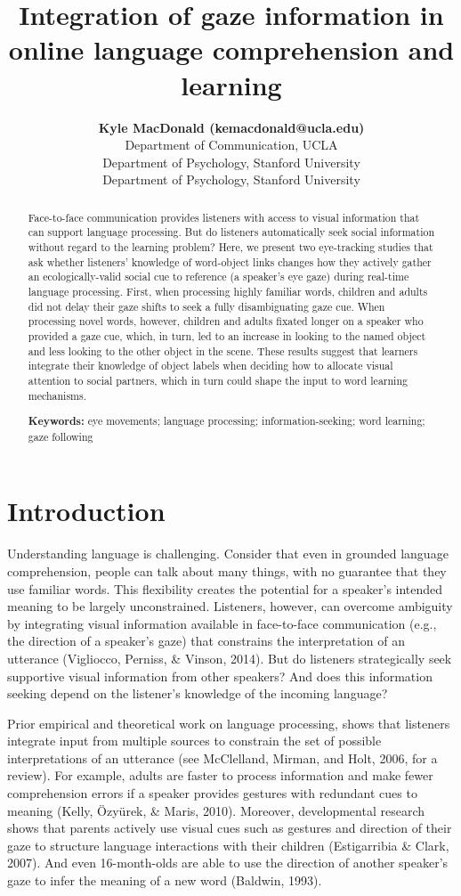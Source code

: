 \documentclass[10pt, letterpaper]{article}
\title{Integration of gaze information in online language comprehension and
learning}
\author{{\large \bf Kyle MacDonald (kemacdonald@ucla.edu)} \\ Department of Communication, UCLA  \AND {\large \bf Elizabeth Swanson (elizswan@stanford.edu)} \\ Department of Psychology, Stanford University  \AND {\large \bf Michael C. Frank (mcfrank@stanford.edu)} \\ Department of Psychology, Stanford University  }
\begin{document}
\maketitle

\begin{abstract}
Face-to-face communication provides listeners with access to visual
information that can support language processing. But do listeners
automatically seek social information without regard to the learning
problem? Here, we present two eye-tracking studies that ask whether
listeners' knowledge of word-object links changes how they actively
gather an ecologically-valid social cue to reference (a speaker's eye
gaze) during real-time language processing. First, when processing
highly familiar words, children and adults did not delay their gaze
shifts to seek a fully disambiguating gaze cue. When processing novel
words, however, children and adults fixated longer on a speaker who
provided a gaze cue, which, in turn, led to an increase in looking to
the named object and less looking to the other object in the scene.
These results suggest that learners integrate their knowledge of object
labels when deciding how to allocate visual attention to social
partners, which in turn could shape the input to word learning
mechanisms.

\textbf{Keywords:}
eye movements; language processing; information-seeking; word learning;
gaze following
\end{abstract}

\hypertarget{introduction}{%
\section{Introduction}\label{introduction}}

Understanding language is challenging. Consider that even in grounded
language comprehension, people can talk about many things, with no
guarantee that they use familiar words. This flexibility creates the
potential for a speaker's intended meaning to be largely unconstrained.
Listeners, however, can overcome ambiguity by integrating visual
information available in face-to-face communication (e.g., the direction
of a speaker's gaze) that constrains the interpretation of an utterance
(Vigliocco, Perniss, \& Vinson, 2014). But do listeners strategically
seek supportive visual information from other speakers? And does this
information seeking depend on the listener's knowledge of the incoming
language?

Prior empirical and theoretical work on language processing, shows that
listeners integrate input from multiple sources to constrain the set of
possible interpretations of an utterance (see McClelland, Mirman, and
Holt, 2006, for a review). For example, adults are faster to process
information and make fewer comprehension errors if a speaker provides
gestures with redundant cues to meaning (Kelly, Özyürek, \& Maris,
2010). Moreover, developmental research shows that parents actively use
visual cues such as gestures and direction of their gaze to structure
language interactions with their children (Estigarribia \& Clark, 2007).
And even 16-month-olds are able to use the direction of another
speaker's gaze to infer the meaning of a new word (Baldwin, 1993).
\end{document}

